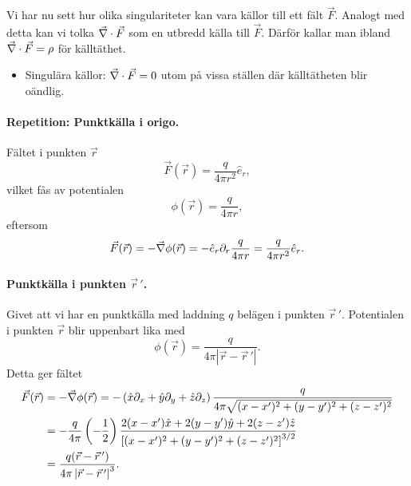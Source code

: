 \documentclass[%
oneside,                 %
final,                   %
10pt]{article}
\newenvironment{warning_mdfboxadmon}[1][]{
\begin{warning_mdfboxmdframed}[frametitle=#1]
}
{
\end{warning_mdfboxmdframed}
}
\begin{document}
\begin{warning_mdfboxadmon}
Vi har nu sett hur olika singulariteter kan vara källor till ett fält $\vec{F}$.  Analogt med detta kan vi tolka $\vec{\nabla} \cdot \vec{F}$ som en utbredd källa till $\vec{F}$.  Därför kallar man ibland $\vec{\nabla} \cdot \vec{F} = \rho$ för källtäthet.

\begin{itemize}
\item Singulära källor: $\vec{\nabla} \cdot \vec{F} = 0$ utom på vissa ställen där källtätheten blir oändlig.
\end{itemize}

\noindent
\end{warning_mdfboxadmon} %



\paragraph{Repetition: Punktkälla i origo.}
Fältet i punkten $\vec{r}$
\begin{equation}
  \vec{F}(\vec{r}) = \frac{q}{4 \pi r^2} \hat{e}_r,
\end{equation}
vilket fås av potentialen
\begin{equation}
  \phi(\vec{r}) = \frac{q}{4 \pi r},
\end{equation}
eftersom
\begin{equation}
  \vec{F}(\vec{r}) = -\vec{\nabla} \phi(\vec{r}) = - \hat{e}_r \partial_r \frac{q}{4 \pi r} = \frac{q}{4 \pi r^2} \hat{e}_r.
\end{equation}

\paragraph{Punktkälla i punkten $\vec{r}\,'$.}
Givet att vi har en punktkälla med laddning $q$ belägen i punkten $\vec{r}\,'$. Potentialen i punkten $\vec{r}$ blir uppenbart lika med
\begin{equation}
  \phi(\vec{r}) = \frac{q}{4 \pi \left| \vec{r} - \vec{r}\,' \right|}.
\end{equation}
Detta ger fältet
\begin{align}
  \vec{F}(\vec{r}) &= -\vec{\nabla} \phi(\vec{r}) = - \left( \hat{x}\partial_x + \hat{y}\partial_y + \hat{z}\partial_z \right) \frac{q}{4 \pi \sqrt{(x-x')^2 + (y-y')^2 + (z-z')^2}} \nonumber \\ 
  &= - \frac{q}{4 \pi} \left( -\frac{1}{2} \right) \frac{ 2(x-x')\hat{x} + 2(y-y')\hat{y} + 2(z-z')\hat{z}}{ \left[ (x-x')^2 + (y-y')^2 + (z-z')^2 \right]^{3/2}} \nonumber \\ 
  &= \frac{q (\vec{r} - \vec{r}\,' )}{4 \pi \left| \vec{r} - \vec{r}\,' \right|^3}.
\end{align}
\end{document}
